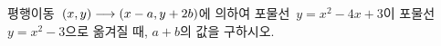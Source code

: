 평행이동~$(x{,}\mkern3mu\mathopen{}y)\longrightarrow(x-a{,}\mkern3mu\mathopen{}y+2b)$에 의하여 포물선~$y=x^2-4x+3$이 포물선~$y=x^2-3$으로 옮겨질 때, $a+b$의 값을 구하시오.

